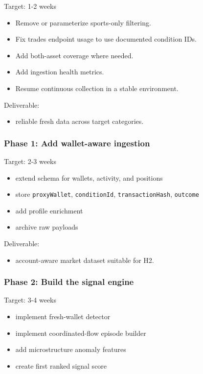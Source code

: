 \documentclass[
]{article}
\providecommand{\tightlist}{%
  \setlength{\itemsep}{0pt}\setlength{\parskip}{0pt}}
\begin{document}
Target: 1-2 weeks

\begin{itemize}
\tightlist
\item
  Remove or parameterize sports-only filtering.
\item
  Fix trades endpoint usage to use documented condition IDs.
\item
  Add both-asset coverage where needed.
\item
  Add ingestion health metrics.
\item
  Resume continuous collection in a stable environment.
\end{itemize}

Deliverable:

\begin{itemize}
\tightlist
\item
  reliable fresh data across target categories.
\end{itemize}

\subsubsection{Phase 1: Add wallet-aware
ingestion}\label{phase-1-add-wallet-aware-ingestion}

Target: 2-3 weeks

\begin{itemize}
\tightlist
\item
  extend schema for wallets, activity, and positions
\item
  store \texttt{proxyWallet}, \texttt{conditionId},
  \texttt{transactionHash}, \texttt{outcome}
\item
  add profile enrichment
\item
  archive raw payloads
\end{itemize}

Deliverable:

\begin{itemize}
\tightlist
\item
  account-aware market dataset suitable for H2.
\end{itemize}

\subsubsection{Phase 2: Build the signal
engine}\label{phase-2-build-the-signal-engine}

Target: 3-4 weeks

\begin{itemize}
\tightlist
\item
  implement fresh-wallet detector
\item
  implement coordinated-flow episode builder
\item
  add microstructure anomaly features
\item
  create first ranked signal score
\end{itemize}
\end{document}
